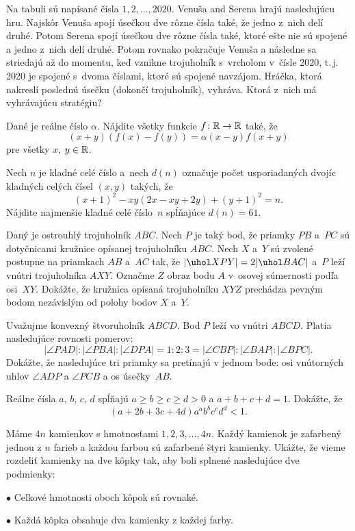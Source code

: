 {%
Na tabuli sú napísané čísla $1,2,\dots,2020$. Venuša and Serena hrajú nasledujúcu hru. Najskôr Venuša spojí úsečkou dve rôzne čísla také, že jedno z~nich delí druhé. Potom Serena spojí úsečkou dve rôzne čísla také, ktoré ešte nie sú spojené a jedno z~nich delí druhé. Potom rovnako pokračuje Venuša a následne sa striedajú až do momentu, keď vznikne trojuholník s~vrcholom v~čísle 2020, t.\,j. 2020 je spojené s~dvoma číslami, ktoré sú spojené navzájom. Hráčka, ktorá nakreslí poslednú úsečku (dokončí trojuholník), vyhráva. Ktorá z~nich má vyhrávajúcu stratégiu?}

{%
Dané je reálne číslo $\alpha$.
Nájdite všetky funkcie $f\colon\Bbb R \rightarrow \Bbb R$ také, že
$$
(x+y)(f(x)-f(y))=\alpha (x-y)f(x+y)
$$
pre všetky $x$, $y \in \Bbb R$.}

{%
Nech $n$ je kladné celé číslo a~nech $d(n)$ označuje počet usporiadaných dvojíc kladných celých čísel $(x,y)$ takých, že
$$(x+1)^2 - xy(2x-xy+2y) + (y+1)^2 = n.$$
Nájdite najmenšie kladné celé číslo~$n$ spĺňajúce $d(n)=61$.}

{%
Daný je ostrouhlý trojuholník $ABC$. Nech $P$ je taký bod, že priamky $PB$ a~$PC$ sú dotyčnicami kružnice opísanej trojuholníku $ABC$. Nech $X$ a~$Y$ sú zvolené postupne na priamkach $AB$ a~$AC$ tak, že $|\uhol XPY| = 2|\uhol BAC|$ a~$P$ leží vnútri trojuholníka $AXY$. Označme $Z$ obraz bodu $A$ v~osovej súmernosti podľa osi~$XY$. Dokážte, že kružnica opísaná trojuholníku $XYZ$ prechádza pevným bodom nezávislým od polohy bodov $X$ a~$Y$.}

{%
Uvažujme konvexný štvoruholník $ABCD$. Bod $P$ leží vo vnútri $ABCD$. Platia nasledujúce rovnosti pomerov:
$$
|\angle PAD|:|\angle PBA|:|\angle DPA|=1:2:3=|\angle CBP|:|\angle BAP|:|\angle BPC|.
$$
Dokážte, že nasledujúce tri priamky sa pretínajú v jednom bode: osi vnútorných uhlov $\angle ADP$ a $\angle PCB$ a os úsečky~$AB$.
}

{%
Reálne čísla $a$, $b$, $c$, $d$ spĺňajú $a\ge b\ge c\ge d>0$ a $a+b+c+d=1$. Dokážte, že
$$
(a+2b+3c+4d)a^a b^b c^c d^d < 1.
$$
}

{%
Máme $4n$ kamienkov s hmotnosťami $1, 2, 3, \dots, 4n$. Každý kamienok je zafarbený jednou z $n$ farieb a každou farbou sú zafarbené štyri kamienky. Ukážte, že vieme rozdeliť kamienky na dve kôpky tak, aby boli splnené nasledujúce dve podmienky:
\item{$\bullet$} Celkové hmotnosti oboch kôpok sú rovnaké.
\item{$\bullet$} Každá kôpka obsahuje dva kamienky z každej farby.}

